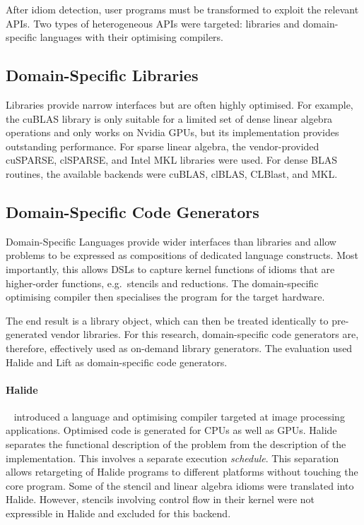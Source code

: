    After idiom detection, user programs must be transformed to exploit the
    relevant APIs.
    Two types of heterogeneous APIs were targeted:
    libraries and domain-specific languages with their optimising compilers.

\subsection{Domain-Specific Libraries}

    Libraries provide narrow interfaces but are often highly optimised.
    For example, the cuBLAS library is only suitable for a limited set of dense
    linear algebra operations and only works on Nvidia GPUs, but its
    implementation provides outstanding performance.
    For sparse linear algebra, the vendor-provided cuSPARSE, clSPARSE, and
    Intel MKL libraries were used.
    For dense BLAS routines, the available backends were cuBLAS, clBLAS,
    CLBlast, and MKL.

\subsection{Domain-Specific Code Generators}

    Domain-Specific Languages provide wider interfaces than libraries and allow
    problems to be expressed as compositions of dedicated language constructs.
    Most importantly, this allows DSLs to capture kernel functions of idioms
    that are higher-order functions, e.g.\ stencils and reductions.
    The domain-specific optimising compiler then specialises the program for the
    target hardware.

    The end result is a library object, which can then be treated
    identically to pre-generated vendor libraries.
    For this research,  domain-specific code generators are, therefore,
    effectively used as on-demand library generators.
    The evaluation used Halide and Lift as domain-specific code generators.

    \paragraph*{Halide}~\citet{Ragan-Kelley2013Halide} introduced a language and
    optimising compiler targeted at image processing applications.
    Optimised code is generated for CPUs as well as GPUs.
    Halide separates the functional description of the problem from the
    description of the implementation.
    This involves a separate execution \emph{schedule}.
    This separation allows retargeting of Halide programs to different platforms
    without touching the core program.
    Some of the stencil and linear algebra idioms were translated into Halide.
    However, stencils involving control flow in their kernel were not
    expressible in Halide and excluded for this backend.

